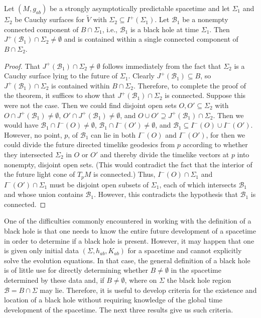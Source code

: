 \begin{theorem}\label{thm:12.2.1}
Let \((M,g_{ab})\) be a strongly asymptotically predictable spacetime and let
\(\Sigma_1\) and \(\Sigma_2\) be Cauchy surfaces for \(\widetilde V\) with
\(\Sigma_2\subseteq I^+(\Sigma_1)\). Let \(\mathcal B_1\) be a nonempty connected
component of \(B\cap\Sigma_1\), i.e., \(\mathcal B_1\) is a black hole at time
\(\Sigma_1\). Then \(J^+(\mathcal B_1)\cap\Sigma_2\ne\emptyset\) and is contained
within a single connected component of \(B\cap\Sigma_2\).
\end{theorem}
\begin{proof}
That \(J^+(\mathcal B_1)\cap\Sigma_2\ne\emptyset\) follows immediately from the
fact that \(\Sigma_2\) is a Cauchy surface lying to the future of \(\Sigma_1\).
Clearly \(J^+(\mathcal B_1)\subseteq B\), so \(J^+(\mathcal B_1)\cap\Sigma_2\) is
contained within \(B\cap\Sigma_2\). Therefore, to complete the proof of the
theorem, it suffices to show that \(J^+(\mathcal B_1)\cap\Sigma_2\) is connected.
Suppose this were not the case. Then we could find disjoint open sets
\(O,O'\subseteq\Sigma_2\) with
\(O\cap J^+(\mathcal B_1)\ne\emptyset\), \(O'\cap J^+(\mathcal B_1)\ne\emptyset\),
and \(O\cup O'\supseteq J^+(\mathcal B_1)\cap\Sigma_2\). Then we would have
\(\mathcal B_1\cap I^-(O)\ne\emptyset\), \(\mathcal B_1\cap I^-(O')\ne\emptyset\),
and \(\mathcal B_1\subseteq I^-(O)\cup I^-(O')\). However, no point, \(p\), of
\(\mathcal B_1\) can lie in both \(I^-(O)\) and \(I^-(O')\), for then we could
divide the future directed timelike geodesics from \(p\) according to whether they
intersected \(\Sigma_2\) in \(O\) or \(O'\) and thereby divide the timelike vectors at
\(p\) into nonempty, disjoint open sets. (This would contradict the fact that the
interior of the future light cone of \(T_pM\) is connected.) Thus,
\(I^-(O)\cap\Sigma_1\) and \(I^-(O')\cap\Sigma_1\) must be disjoint open subsets
of \(\Sigma_1\), each of which intersects \(\mathcal B_1\) and whose union contains
\(\mathcal B_1\). However, this contradicts the hypothesis that \(\mathcal B_1\) is
connected.
\end{proof}

One of the difficulties commonly encountered in working with the definition of a
black hole is that one needs to know the entire future development of a spacetime in
order to determine if a black hole is present. However, it may happen that one is
given only initial data \((\Sigma,h_{ab},K_{ab})\) for a spacetime and cannot
explicitly solve the evolution equations. In that case, the general definition of a
black hole is of little use for directly determining whether \(B\ne\emptyset\) in the
spacetime determined by these data and, if \(B\ne\emptyset\), where on \(\Sigma\)
the black hole region \(\mathcal B=B\cap\Sigma\) may lie. Therefore, it is useful to
develop criteria for the existence and location of a black hole without requiring
knowledge of the global time development of the spacetime. The next three results
give us such criteria.

